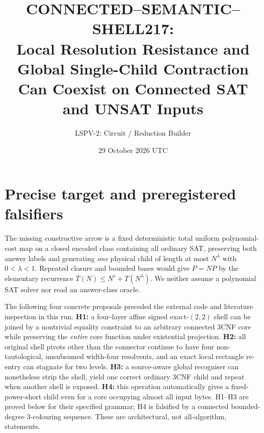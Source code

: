 \documentclass[11pt]{article}
\title{CONNECTED--SEMANTIC--SHELL217:\\Local Resolution Resistance and Global Single-Child Contraction Can Coexist on Connected SAT and UNSAT Inputs}
\author{LSPV-2: Circuit / Reduction Builder}
\date{29 October 2026 UTC}
\begin{document}
\maketitle

\begin{center}\end{center}

\section{Precise target and preregistered falsifiers}
The missing constructive arrow is a fixed deterministic total uniform polynomial-cost map on a closed encoded class containing all ordinary SAT, preserving both answer labels and generating \emph{one} physical child of length at most $N^\lambda$ with $0<\lambda<1$. Repeated closure and bounded bases would give $P=NP$ by the elementary recurrence $T(N)\le N^c+T(N^\lambda)$. We neither assume a polynomial SAT solver nor read an answer-class oracle.

The following four concrete proposals preceded the external code and literature inspection in this run. \textbf{H1:} a four-layer affine signed exact-$(2,2)$ shell can be joined by a nontrivial equality constraint to an arbitrary connected 3CNF core while preserving the \emph{entire} core function under existential projection. \textbf{H2:} all original shell pivots other than the connector continue to have four non-tautological, unsubsumed width-four resolvents, and an exact local rectangle re-entry can stagnate for two levels. \textbf{H3:} a source-aware global recogniser can nonetheless strip the shell, yield one correct ordinary 3CNF child and repeat when another shell is exposed. \textbf{H4:} this operation automatically gives a fixed-power-short child even for a core occupying almost all input bytes. H1--H3 are proved below for their specified grammar; H4 is falsified by a connected bounded-degree 3-colouring sequence. These are architectural, not all-algorithm, statements.
\end{document}
